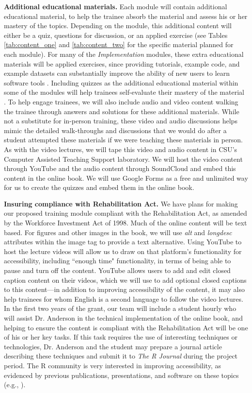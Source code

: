 \documentclass[pdftex,english,11pt,parskip=half]{scrartcl}
\begin{document}
\textbf{Additional educational materials.} Each module will contain additional
educational material, to help the trainee absorb the material and assess his or
her mastery of the topics. Depending on the module, this additional content will
either be a quiz, questions for discussion, or an applied exercise (see Tables
\ref{tab:content_one} and \ref{tab:content_two} for the specific material
planned for each module). For many of the \textit{Implementation} modules, these extra educational materials will be applied exercises, since providing tutorials, example code, and example datasets can substantially improve the ability of new users to learn software tools \cite{list2017ten, searls2012ten, via2011ten}. Including quizzes as the additional educational material within some of the modules will help trainees self-evaluate their mastery of the material \cite{searls2012ten, via2011ten}. 
To help engage trainees, we will also include audio and
video content walking the trainee through answers and solutions for these
additional materials. While not a substitute for in-person training, these video
and audio discussions helps mimic the detailed
walk-throughs and discussions that we would do after a student attempted these
materials if we were teaching these materials in person. As with the video lectures, we will tape this video
and audio content in CSU's Computer Assisted Teaching Support laboratory. We will host the video content through YouTube and the
audio content through SoundCloud and embed this content in the online book. We will use Google Forms as a free and unlimited way
for us to create the quizzes and embed them in the online book.

\noindent \textbf{Insuring compliance with Rehabilitation Act.} We have plans
for making our proposed training module compliant with the
Rehabilitation Act, as amended by the Workforce Investment
Act of 1998. Much of the online content will be text based. For figures and
other images in the book, we will use \textit{alt} and \textit{longdesc} attributes
within the image tag to provide a text alternative. Using YouTube to host the
lecture videos will allow us to draw on that platform's functionality for accessibility,
including ``enough time" functionality, in terms of being able to pause and turn
off the content. YouTube allows users to add and edit closed caption content on
their videos, which we will use to add optional closed captions to this
content---in addition to improving accessibility of the content, it may also
help trainees for whom English is a second language to follow the video lectures. In
the first two years of the grant, our team will include a student hourly who will assist
Dr. Anderson in the technical implementation of the online book, and helping to
ensure the content is compliant with the Rehabilitation Act will be one of his or her
key tasks. If this task requires the use of interesting techniques or
technologies, Dr. Anderson and the student may prepare a journal article
describing these techniques and submit it to \textit{The R Journal} during the
project period. The R community is very interested in improving
accessibility, as evidenced by previous publications, presentations, and
software on these topics (e.g., \cite{uswebr, godfrey2013statistical}).
\end{document}
